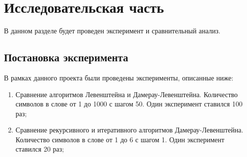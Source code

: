 \documentclass[a4paper, 12pt]{article}
\begin{document}
\section{Исследовательская часть }
\begin{flushleft}
	\hspace*{5mm} В данном разделе будет проведен эксперимент и сравнительный анализ.
	\subsection{Постановка эксперимента}
	В рамках данного проекта были проведены эксперименты, описанные ниже:
	\begin{enumerate}
		\item Сравнение алгоритмов Левенштейна и Дамерау-Левенштейна. Количество символов в слове от 1 до 1000 с шагом 50. Один эксперимент ставился 100 раз;
		\item Сравнение рекурсивного и итеративного алгоритмов Дамерау-Левенштейна. Количество символов в слове от 1 до 6 с шагом 1. Один эксперимент ставился 20 раз;
	\end{enumerate}

\end{flushleft}
\end{document}
